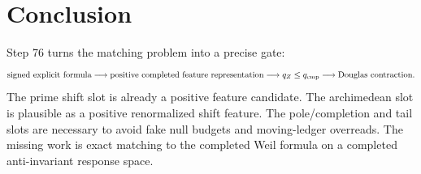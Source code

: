 \documentclass[11pt]{article}
\begin{document}
\section{Conclusion}
Step 76 turns the matching problem into a precise gate:
\[
 \text{signed explicit formula}
 \longrightarrow
 \text{positive completed feature representation}
 \longrightarrow
 q_Z\le q_{\rm cmp}
 \longrightarrow
 \text{Douglas contraction}.
\]
The prime shift slot is already a positive feature candidate. The archimedean slot is plausible as a positive renormalized shift feature. The pole/completion and tail slots are necessary to avoid fake null budgets and moving-ledger overreads. The missing work is exact matching to the completed Weil formula on a completed anti-invariant response space.
\end{document}
